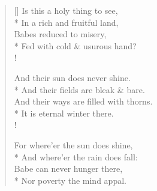 \documentclass[MAIN]{subfiles}
\begin{document}
\settowidth{\versewidth}{\vin Fed with cold and usurous hand?}
\begin{verse}[\versewidth]
Is this a holy thing to see,\\*
\vin In a rich and fruitful land,\\
Babes reduced to misery,\\*
\vin Fed with cold \& usurous hand?\\!

And their sun does never shine.\\*
\vin And their fields are bleak \& bare.\\
And their ways are filled with thorns.\\*
\vin It is eternal winter there.\\!

For where'er the sun does shine,\\*
\vin And where'er the rain does fall:\\
Babe can never hunger there,\\*
\vin Nor poverty the mind appal.
\end{verse}
\end{document}
